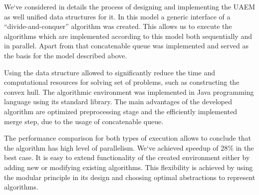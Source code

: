\documentclass[a4paper,UKenglish,cleveref, autoref]{socg-lipics-v2019}
\begin{document}
	We`ve considered in details the process of designing and implementing the UAEM as well unified data structures for it. In this model a generic interface of a ``divide-and-conquer'' algorithm was created. This allows us to execute the algorithms which are implemented according to this model both sequentially and in parallel. Apart from that concatenable queue was implemented and served as the basis for the model described above.
	
	Using the data structure allowed to significantly reduce the time and computational resources for solving set of problems, such as constructing the convex hull. The algorithmic environment was implemented in Java programming language using its standard library. The main advantages of the developed algorithm are optimized preprocessing stage and the efficiently implemented merge step, due to the usage of concatenable queue.
	
	The performance comparison for both types of execution allows to conclude that the algorithm has high level of parallelism. We`ve achieved speedup of $28\%$ in the best case. It is easy to extend functionality of the created environment either by adding new or modifying existing algorithms. This flexibility is achieved by using the modular principle in its design and choosing optimal abstractions to represent algorithms.


\end{document}
